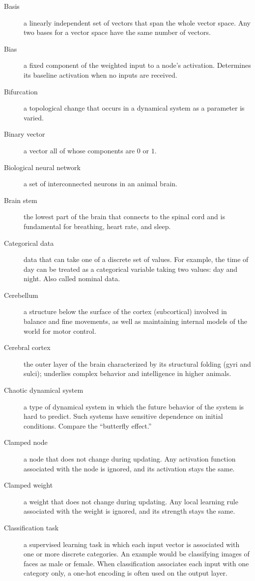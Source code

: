 \begin{description}
\item[Basis] a linearly independent set of vectors that span the whole vector space. Any two bases for a vector space have the same number of vectors.
\item[Bias] a fixed component of the weighted input to a node's activation. Determines its baseline activation when no inputs are received.
\item[Bifurcation] a topological change that occurs in a dynamical system as a parameter is varied.
\item[Binary vector] a vector all of whose components are $0$ or $1$.
\item[Biological neural network] a set of interconnected neurons in an animal brain.
\item[Brain stem] the lowest part of the brain that connects to the spinal cord and is fundamental for breathing, heart rate, and sleep.
\item[Categorical data] data that can take one of a discrete set of values. For example, the time of day can be treated as a categorical variable taking two values: day and night. Also called nominal data.
\item[Cerebellum] a structure below the surface of the cortex (subcortical) involved in balance and fine movements, as well as maintaining internal models of the world for motor control.
\item[Cerebral cortex] the outer layer of the brain characterized by its structural folding (gyri and sulci); underlies complex behavior and intelligence in higher animals. 
\item[Chaotic dynamical system] a type of dynamical system in which the future behavior of the system is hard to predict. Such systems have sensitive dependence on initial conditions. Compare the ``butterfly effect.''
\item[Clamped node] a node that does not change during updating. Any activation function associated with the node is ignored, and its activation stays the same.
\item[Clamped weight] a weight that does not change during updating. Any local learning rule associated with the weight is ignored, and its strength stays the same.
\item[Classification task] a supervised learning task in which each input vector is associated with one or more discrete  categories. An example would be classifying images of faces as male or female. When classification associates each input with one category only, a one-hot encoding is often used on the output layer.

\end{description}

